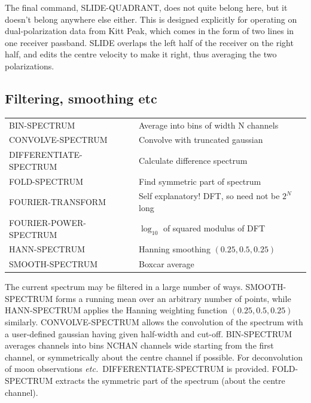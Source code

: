 \documentclass[11pt,twoside]{report}
\newcommand{\etc}{{\it etc.\,}}
\begin{document}
The final command, SLIDE-QUADRANT, does not quite belong here, but it doesn't
belong anywhere else either. This is designed explicitly for operating on
dual-polarization data from Kitt Peak, which comes in the form of two lines
in one receiver passband. SLIDE overlaps the left half of the receiver on the
right half, and edits the centre velocity to make it right, thus averaging
the two polarizations.

\subsection{Filtering, smoothing etc}  

\begin{tabular}{ll}
BIN-SPECTRUM             & Average into bins of width N channels\\
CONVOLVE-SPECTRUM        & Convolve with truncated gaussian\\
DIFFERENTIATE-SPECTRUM   & Calculate difference spectrum\\
FOLD-SPECTRUM            & Find symmetric part of spectrum\\
FOURIER-TRANSFORM        & Self explanatory! DFT, so need not be $2^N$ long\\
FOURIER-POWER-SPECTRUM   & $\log_{10}$ of squared modulus of DFT\\
HANN-SPECTRUM            & Hanning smoothing $(0.25,0.5,0.25)$\\
SMOOTH-SPECTRUM          & Boxcar average\\
\end{tabular}

The current spectrum may be filtered in a large number of ways. SMOOTH-SPECTRUM
forms a running mean  over an arbitrary number of points,
while HANN-SPECTRUM applies the Hanning  weighting function
$(0.25, 0.5, 0.25)$ similarly. CONVOLVE-SPECTRUM allows the convolution
of the spectrum with a user-defined gaussian
having given half-width and cut-off. BIN-SPECTRUM  averages
channels into bins NCHAN channels wide starting from the first channel, or
symmetrically about the centre channel if possible. For deconvolution
 of moon  observations \etc
DIFFERENTIATE-SPECTRUM is provided. FOLD-SPECTRUM extracts the symmetric part
of the spectrum (about
the centre channel). 
\end{document}
